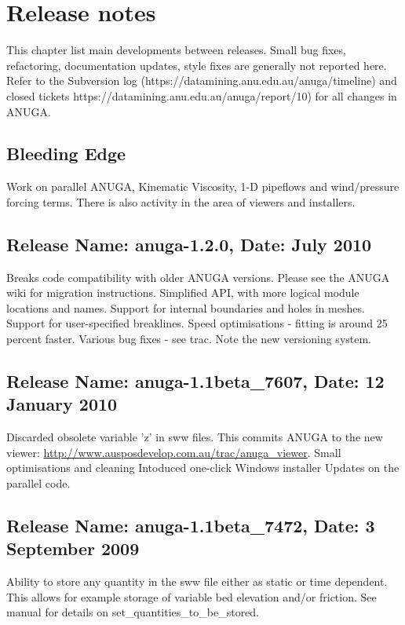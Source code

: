 \documentclass{manual}
\begin{document}
\chapter{Release notes}

This chapter list main developments between releases. Small bug fixes, 
refactoring, documentation updates, style fixes are generally not reported 
here. Refer to the Subversion 
log (https://datamining.anu.edu.au/anuga/timeline) and closed tickets
https://datamining.anu.edu.au/anuga/report/10) for all changes in ANUGA.

\section{Bleeding Edge}

Work on parallel ANUGA, Kinematic Viscosity, 1-D pipeflows and wind/pressure
forcing terms. There is also activity in the area of viewers and installers.

\section{Release Name: anuga-1.2.0, Date: July 2010}
Breaks code compatibility with older ANUGA versions. Please see the ANUGA wiki for migration instructions.
Simplified API, with more logical module locations and names. 
Support for internal boundaries and holes in meshes.
Support for user-specified breaklines.
Speed optimisations - fitting is around 25 percent faster.
Various bug fixes - see trac. Note the new versioning system.


\section{Release Name: anuga-1.1beta\_7607, Date: 12 January 2010}
Discarded obsolete variable 'z' in sww files. This commits ANUGA to the 
new viewer: \url{http://www.ausposdevelop.com.au/trac/anuga_viewer}.
Small optimisations and cleaning
Intoduced one-click Windows installer
Updates on the parallel code.

\section{Release Name: anuga-1.1beta\_7472, Date: 3 September 2009}

Ability to store any quantity in the sww file either as static or 
time dependent. This allows for example storage of variable bed elevation 
and/or friction. See manual for details on set\_quantities\_to\_be\_stored.
\end{document}
